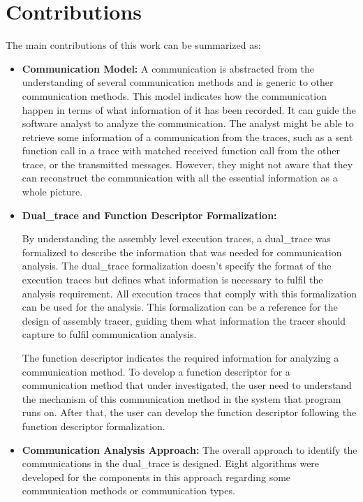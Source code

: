 \section{Contributions}
The main contributions of this work can be summarized as:
\begin{itemize}
  \item \textbf{Communication Model:} A communication is abstracted from the understanding of several communication methods and is generic to other communication methods. This model indicates how the communication happen in terms of what information of it has been recorded. It can guide the software analyst to analyze the communication. The analyst might be able to retrieve some information of a communication from the traces, such as a sent function call in a trace with matched received function call from the other trace, or the transmitted messages. However, they might not aware that they can reconstruct the communication with all the essential information as a whole picture.
  
  \item \textbf{Dual\_trace and Function Descriptor Formalization:} 
  
By understanding the assembly level execution traces, a dual\_trace was formalized to describe the information that was needed for communication analysis. The dual\_trace formalization doesn't specify the format of the execution traces but defines what information is necessary to fulfil the analysis requirement. All execution traces that comply with this formalization can be used for the analysis. This formalization can be a reference for the design of assembly tracer, guiding them what information the tracer should capture to fulfil communication analysis.

The function descriptor indicates the required information for analyzing a communication method. To develop a function descriptor for a communication method that under investigated, the user need to understand the mechanism of this communication method in the system that program runs on. After that, the user can develop the function descriptor following the function descriptor formalization.

  \item \textbf{Communication Analysis Approach:} The overall approach to identify the communications in the dual\_trace is designed. Eight algorithms were developed for the components in this approach regarding some communication methods or communication types. 
  

\end{itemize}
